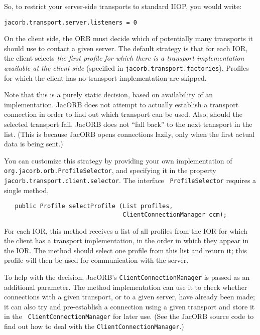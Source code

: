 So, to restrict your server-side transports to standard IIOP, you
would write:

\begin{verbatim}
jacorb.transport.server.listeners = 0
\end{verbatim}

On the client side, the ORB must decide which of potentially many
 transports it should use to contact a given server.  The default
 strategy is that for each IOR, the client selects \emph{the first profile
 for which there is a transport implementation available at the client
 side} (specified in {\tt jacorb.transport.factories}).  Profiles for
which the client has no transport implementation are skipped.

Note that this is a purely static decision, based on availability of
 an implementation.  JacORB does not attempt to actually establish a
 transport connection in order to find out which transport can be
 used.  Also, should the selected transport fail, JacORB does not
 ``fall back'' to the next transport in the list.  (This is because
 JacORB opens connections lazily, only when the first actual data is
 being sent.)

You can customize this strategy by providing your own implementation of
{\tt org.jacorb.orb.ProfileSelector}, and specifying it in the
property {\tt jacorb.transport.client.selector}.  The interface {\tt
ProfileSelector} requires a single method,

\begin{verbatim}
   public Profile selectProfile (List profiles,
                                 ClientConnectionManager ccm);
\end{verbatim}

For each IOR, this method receives a list of all profiles from the IOR
 for which the client has a transport implementation, in the order in
 which they appear in the IOR.  The method should select one profile
 from this list and return it; this profile will then be used for
 communication with the server.

To help with the decision, JacORB's {\tt ClientConnectionManager} is
 passed as an additional parameter.  The method implementation can use
 it to check whether connections with a given transport, or to a given
 server, have already been made; it can also try and pre-establish a
 connection using a given transport and store it in the {\tt
 ClientConnectionManager} for later use.  (See the JacORB source code
to find out how to deal with the {\tt ClientConnectionManager}.)

